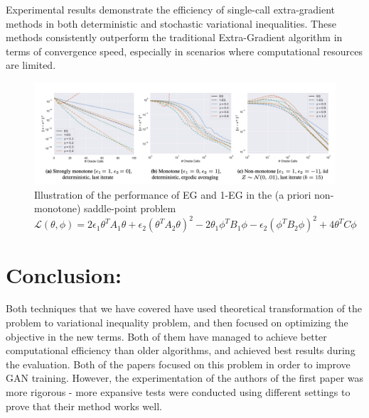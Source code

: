 \documentclass[11pt]{article}
\begin{document}
        Experimental results demonstrate the efficiency of single-call extra-gradient methods in both deterministic and stochastic variational inequalities. These methods consistently outperform the traditional Extra-Gradient algorithm in terms of convergence speed, especially in scenarios where computational resources are limited.
        \begin{figure}[h]
            \centering
            \includegraphics[scale=0.5]{../../pictures/pic1.png}
            \caption{Illustration of the performance of EG and 1-EG in the (a priori non-monotone) saddle-point problem $\mathcal{L}(\theta, \phi) = 2 \epsilon_1 \theta^T A_1 \theta + \epsilon_2 (\theta^T A_2 \theta)^2 - 2 \theta_1 \phi^T B_1 \phi - \epsilon_2 (\phi^T B_2 \phi)^2 + 4\theta^T C \phi$ }
            \label{fig:label}
        \end{figure}
 
	
\section{Conclusion:}
	Both techniques that we have covered have used theoretical transformation of the problem to variational inequality problem, and then focused on optimizing the objective in the new terms. Both of them have managed to achieve better computational efficiency than older algorithms, and achieved best results during the evaluation. Both of the papers focused on this problem in order to improve GAN training. However, the experimentation of the authors of the first paper was more rigorous - more expansive tests were conducted using different settings to prove that their method works well.
\end{document}
